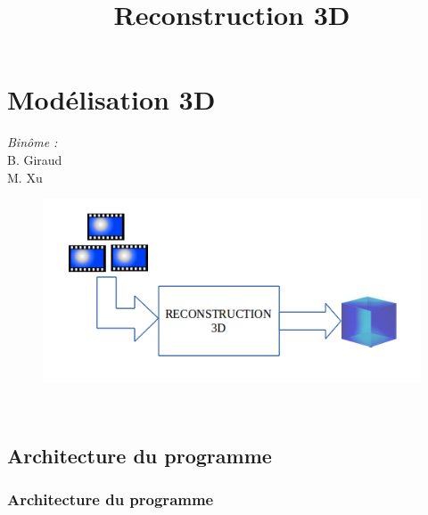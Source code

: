 
 \section{Modélisation 3D}
 \begin{frame}
 \title{Reconstruction 3D}
 \titlepage

    \begin{minipage}{0.3\textwidth}
    \begin{flushleft} \large
    \emph{Binôme :}\\
    B. Giraud\\
    M. Xu
    \end{flushleft}
    \end{minipage}
    \begin{minipage}{0.5\textwidth}
    \begin{flushright} \large
    \begin{figure}
    \includegraphics[width=1.4\textwidth]{Fig/architectureSectionReco3d.png}
    \end{figure}
    \end{flushright}
    \end{minipage}\\[3cm]
    
 \end{frame} 
 
\subsection{Architecture du programme}
\begin{frame}
  \frametitle{Architecture du programme}

\end{frame}	  
	  
